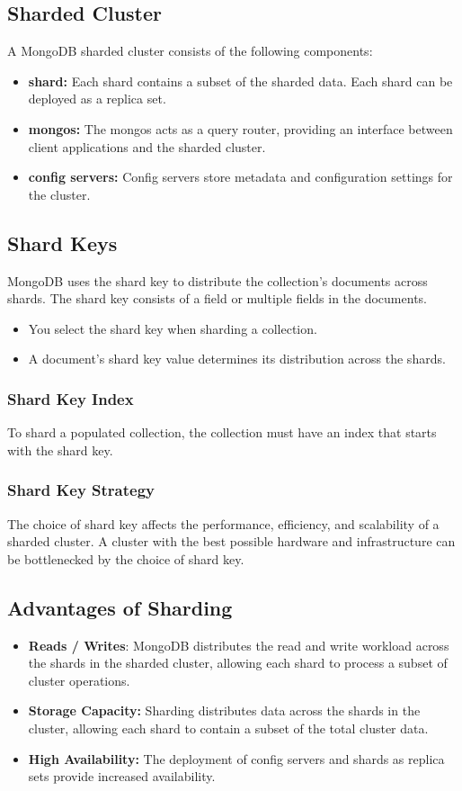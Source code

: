 \subsection{Sharded Cluster}
A MongoDB sharded cluster consists of the following components:
\begin{itemize}
    \item \textbf{shard:} Each shard contains a subset of the sharded data. Each shard can be deployed as a replica set.
    \item \textbf{mongos:} The mongos acts as a query router, providing an interface between client applications and the sharded cluster.
    \item \textbf{config servers:} Config servers store metadata and configuration settings for the cluster.
\end{itemize}

\subsection{Shard Keys}
MongoDB uses the shard key to distribute the collection's documents across shards. The shard key consists of a field or multiple fields in the documents.
\begin{itemize}
    \item You select the shard key when sharding a collection.
    \item A document's shard key value determines its distribution across the shards.
\end{itemize}
\subsubsection{Shard Key Index}
To shard a populated collection, the collection must have an index that starts with the shard key.

\subsubsection{Shard Key Strategy}
The choice of shard key affects the performance, efficiency, and scalability of a sharded cluster. A cluster with the best possible hardware and infrastructure can be bottlenecked by the choice of shard key.

\subsection{Advantages of Sharding}
\begin{itemize}
    \item \textbf{Reads / Writes}: MongoDB distributes the read and write workload across the shards in the sharded cluster, allowing each shard to process a subset of cluster operations.
    \item \textbf{Storage Capacity:} Sharding distributes data across the shards in the cluster, allowing each shard to contain a subset of the total cluster data. 
    \item \textbf{High Availability:} The deployment of config servers and shards as replica sets provide increased availability.
\end{itemize}

